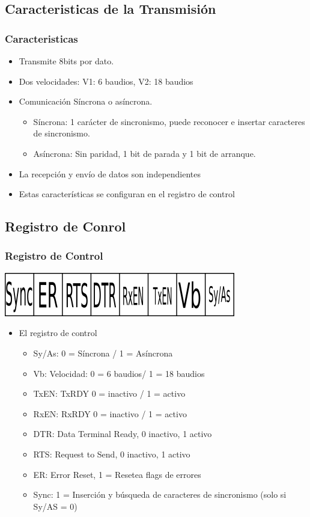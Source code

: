 \documentclass{beamer}
\begin{document}
\subsection{Caracteristicas de la Transmisión}
\begin{frame}
\frametitle{Caracteristicas}
\begin{itemize}
 \item Transmite 8bits por dato.
 \item Dos velocidades: V1: 6 baudios, V2: 18 baudios
 \item Comunicación Síncrona o asíncrona.
  \begin{itemize}
   \item Síncrona: 1 carácter de sincronismo, puede reconocer e insertar caracteres de sincronismo.
   \item Asíncrona: Sin paridad, 1 bit de parada y 1 bit de arranque.
  \end{itemize}
 \item La recepción y envío de datos son independientes
 \item Estas características se configuran en el registro de control
\end{itemize}
\end{frame}

\subsection{Registro de Conrol}
\begin{frame}
\frametitle{Registro de Control}
\begin{center}
 \includegraphics[scale=0.50]{usart-ctrl.png}
\end{center}

\begin{itemize}
 \item El registro de control 
 \begin{itemize}
   \item Sy/As: 0 = Síncrona / 1 = Asíncrona
   \item Vb: Velocidad: 0 = 6 baudios/ 1 = 18 baudios
   \item TxEN: TxRDY 0 = inactivo / 1 = activo
   \item RxEN: RxRDY 0 = inactivo / 1 = activo
   \item DTR: Data Terminal Ready, 0 inactivo, 1 activo
   \item RTS: Request to Send, 0 inactivo, 1 activo
   \item ER: Error Reset, 1 = Resetea flags de errores
   \item Sync: 1 = Inserción y búsqueda de caracteres de sincronismo (solo si Sy/AS = 0)
  \end{itemize}
\end{itemize}
\end{frame}
\end{document}
